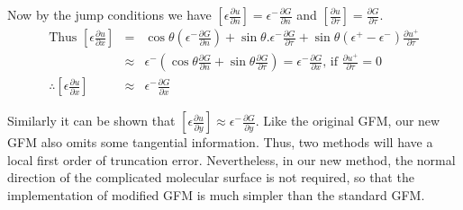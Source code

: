 Now by the jump conditions we have $ \left[\epsilon \frac{\partial u}{\partial n}\right] =\epsilon^- \frac{\partial G}{\partial n}$ and $\left[\frac{\partial u}{\partial \tau}\right]= \frac{\partial G}{\partial \tau}.$
\begin{eqnarray*}
\text{Thus } \left[\epsilon \frac{\partial u}{\partial x}\right] &=& \cos \theta (\epsilon^- \frac{\partial G}{\partial n})+\sin \theta .\epsilon^- \frac{\partial G}{\partial \tau} +\sin \theta (\epsilon^+ -\epsilon^- ) \frac{\partial u^+}{\partial \tau}\\
&\approx & \epsilon^-(\cos \theta  \frac{\partial G}{\partial n}+\sin \theta\frac{\partial G}{\partial \tau}) = \epsilon^- \frac{\partial G}{\partial x}\text{, if }\frac{\partial u^+}{\partial \tau}=0\\
\therefore\left[\epsilon \frac{\partial u}{\partial x}\right]&\approx &  \epsilon^- \frac{\partial G}{\partial x}
\end{eqnarray*}

Similarly it can be shown that $\left[\epsilon \frac{\partial u}{\partial y}\right] \approx   \epsilon^- \frac{\partial G}{\partial y}$. Like the original GFM, our new GFM also omits some tangential information. Thus, two methods will have a local first order of truncation error. Nevertheless, in our new method, the normal direction of the complicated molecular surface is not required, so that the implementation of modified GFM is much simpler than the standard GFM. 



